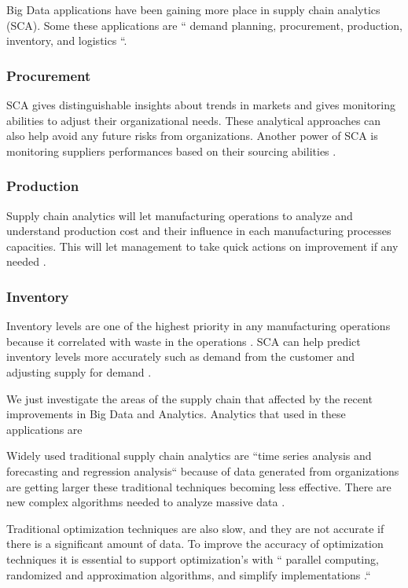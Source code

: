 \documentclass[sigconf]{acmart}
\begin{document}
Big Data applications have been gaining more place in supply chain analytics (SCA). Some these applications are `` demand planning, procurement, production, inventory, and logistics \cite{WANG201698}``. 

\subsubsection{Procurement}

SCA gives distinguishable insights about trends in markets and gives monitoring abilities to adjust their organizational needs. These analytical approaches can also help avoid any future risks from organizations. Another power of SCA is monitoring suppliers performances based on their sourcing abilities \cite{WANG201698}. 

\subsubsection{Production}

Supply chain analytics will let manufacturing operations to analyze and understand production cost and their influence in each manufacturing processes capacities. This will let management to take quick actions on improvement if any needed \cite{WANG201698}.

\subsubsection{Inventory}
Inventory levels are one of the highest priority in any manufacturing operations because it correlated with waste in the operations \cite{www-toyota}. SCA can help predict inventory levels more accurately such as demand from the customer and adjusting supply for demand \cite{WANG201698}. 

\par We just investigate the areas of the supply chain that affected by the recent improvements in Big Data and Analytics. Analytics that used in these applications are 

\par Widely used traditional supply chain analytics are ``time series analysis and forecasting and regression analysis`` because of data generated from organizations are getting larger these traditional techniques becoming less effective. There are new complex algorithms needed to analyze massive data \cite{WANG201698}. 

\par Traditional optimization techniques are also slow, and they are not accurate if there is a significant amount of data. To improve the accuracy of optimization techniques it is essential to support optimization's with `` parallel computing, randomized and approximation algorithms, and simplify implementations \cite{WANG201698}.``
\end{document}
